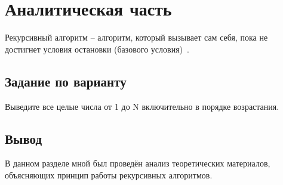 \chapter{Аналитическая часть}

Рекурсивный алгоритм -- алгоритм, который вызывает сам себя, пока не достигнет условия остановки (базового условия)~\cite{lit1}.

\section{Задание по варианту}

Выведите все целые числа от 1 до N включительно в порядке возрастания.

\section*{Вывод}

В данном разделе мной был проведён анализ теоретических материалов, объясняющих принцип работы рекурсивных алгоритмов.

\clearpage
